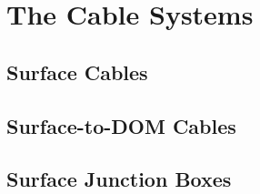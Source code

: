 
\section{The Cable Systems}
\label{sec:cable}
\subsection{Surface Cables}
\subsection{Surface-to-DOM Cables}
\subsection{Surface Junction Boxes}
